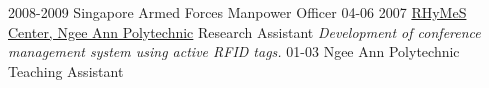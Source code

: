 \documentclass[]{friggeri-cv}
\begin{document}
\begin{entrylist}
	\entry
	{2008-2009}
	{Singapore Armed Forces}
	{Manpower Officer}
	{}
	\entry
	{04-06 2007}
	{\href{http://www.np.edu.sg/ict/facilities/rhymes/Pages/loc\_rhymes.aspx}{RHyMeS Center, Ngee Ann Polytechnic}}
	{Research Assistant}
	{\emph{Development of conference management system using active RFID tags.}}
	\entry
	{01-03}
	{Ngee Ann Polytechnic}
	{Teaching Assistant}
	{}
\end{entrylist}

\end{document}
